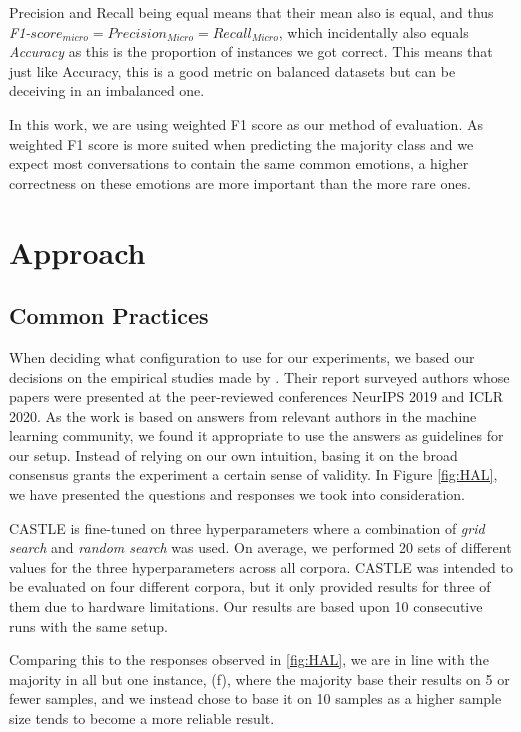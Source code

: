 \documentclass[nofilelist]{cslthse-msc}
\begin{document}
Precision and Recall being equal means that their mean also is equal, and thus \textit{F1-}$score_{micro} = Precision_{Micro} = Recall_{Micro}$, which incidentally also equals \textit{Accuracy} as this is the proportion of instances we got correct. This means that just like Accuracy, this is a good metric on balanced datasets but can be deceiving in an imbalanced one.

In this work, we are using weighted F1 score as our method of evaluation. As weighted F1 score is more suited when predicting the majority class and we expect most conversations to contain the same common emotions, a higher correctness on these emotions are more important than the more rare ones.



\chapter{Approach}



\section{Common Practices}
When deciding what configuration to use for our experiments, we based our decisions on the empirical studies made by  \citet{bouthillier:hal-02447823}. Their report surveyed authors whose papers were presented at the peer-reviewed conferences NeurIPS 2019 and ICLR 2020. As the work is based on answers from relevant authors in the machine learning community, we found it appropriate to use the answers as guidelines for our setup. Instead of relying on our own intuition, basing it on the broad consensus grants the experiment a certain sense of validity. In Figure \ref{fig:HAL}, we have presented the questions and responses we took into consideration.

CASTLE is fine-tuned on three hyperparameters where a combination of \textit{grid search} and \textit{random search} was used. On average, we performed 20 sets of different values for the three hyperparameters across all corpora. CASTLE was intended to be evaluated on four different corpora, but it only provided results for three of them due to hardware limitations. Our results are based upon 10 consecutive runs with the same setup. 

Comparing this to the responses observed in \ref{fig:HAL}, we are in line with the majority in all but one instance, (f), where the majority base their results on 5 or fewer samples, and we instead chose to base it on 10 samples as a higher sample size tends to become a more reliable result.
\end{document}
